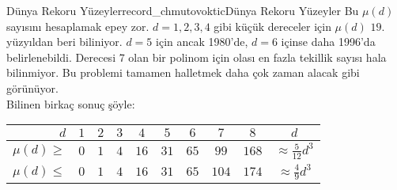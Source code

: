 \begin{surferIntroPage}{Dünya Rekoru Yüzeyler}{record_chmutovoktic}{Dünya Rekoru Yüzeyler}
Bu  $\mu(d)$  sayısını hesaplamak epey zor. $d=1,2,3,4$ gibi küçük dereceler için  $\mu(d)$ 
$19.$ yüzyıldan beri biliniyor. $d=5$ için ancak 1980'de, $d=6$ içinse daha 1996'da belirlenebildi.  
Derecesi 7 olan bir polinom için olası en fazla tekillik sayısı hala bilinmiyor.
Bu problemi tamamen halletmek daha çok zaman alacak gibi görünüyor. \\  Bilinen birkaç sonuç şöyle:
    
   \begin{center}
      \begin{tabular}{r|cccccccc|c}
        $d$ & $1$ & $2$ & $3$ & $4$ & $5$ & $6$ & $7$ & $8$ & $d$\\
        \hline
        \hline
        \rule{0pt}{1.2em}$\mu(d)\ge$ & $0$ & $1$ & $4$ & $16$ & $31$ & $65$ &
        $99$ & $168$ & 
        $\approx \frac{5}{12}d^3$\\[0.3em]
        \hline
        \rule{0pt}{1.2em}$\mu(d)\le$ & $0$ & $1$ & $4$ & $16$ & $31$ & $65$ &
        $104$ & $174$ & $\approx \frac{4}{9}d^3$
      \end{tabular}
    \end{center}
\end{surferIntroPage}

